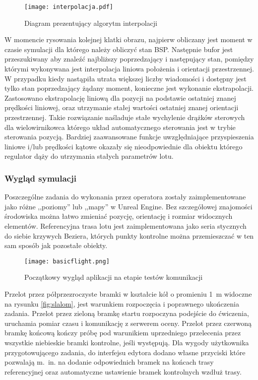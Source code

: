 \begin{figure}[!h]
    \caption{Diagram prezentujący algorytm interpolacji}
    \label{fig:interpolacja}
    \centering \texttt{[image: interpolacja.pdf]}
\end{figure}

W momencie rysowania kolejnej klatki obrazu, najpierw obliczany jest moment w czasie symulacji dla którego należy obliczyć stan BSP. Następnie bufor jest przeszukiwany aby znaleźć najbliższy poprzedzający i następujący stan, pomiędzy którymi wykonywana jest interpolacja liniowa położenia i orientacji przestrzennej. W przypadku kiedy nastąpiła utrata większej liczby wiadomości i dostępny jest tylko stan poprzedzający żądany moment, konieczne jest wykonanie ekstrapolacji. Zastosowano ekstrapolację liniową dla pozycji na podstawie ostatniej znanej prędkości liniowej, oraz utrzymanie stałej wartości ostatniej znanej orientacji przestrzennej. Takie rozwiązanie naśladuje stałe wychylenie drążków sterowych dla wielowirnikowca którego układ automatycznego sterowania jest w trybie sterowania pozycją. Bardziej zaawansowane funkcje uwzględniające przyspieszenia liniowe i/lub prędkości kątowe okazały się nieodpowiednie dla obiektu którego regulator dąży do utrzymania stałych parametrów lotu.

\subsubsection{Wygląd symulacji}
Poszczególne zadania do wykonania przez operatora zostały zaimplementowane jako różne ,,poziomy'' lub ,,mapy'' w Unreal Engine. Bez szczegółowej znajomości środowiska można łatwo zmieniać pozycję, orientację i rozmiar widocznych elementów. Referencyjna trasa lotu jest zaimplementowana jako seria stycznych do siebie krzywych Beziera, których punkty kontrolne można przemieszczać w ten sam sposób jak pozostałe obiekty.

\begin{figure}[!h]
    \caption{Początkowy wygląd aplikacji na etapie testów komunikacji}
    \label{fig:basicflight}
    \centering \texttt{[image: basicflight.png]}
\end{figure}

Przelot przez półprzezroczyste bramki w kształcie kół o promieniu 1~m widoczne na rysunku \ref{fig:slalom}, jest warunkiem rozpoczęcia i poprawnego ukończenia zadania. Przelot przez zieloną bramkę startu rozpoczyna podejście do ćwiczenia, uruchamia pomiar czasu i komunikację z serwerem oceny. Przelot przez czerwoną bramkę końcową kończy próbę pod warunikiem uprzedniego przelecenia przez wszystkie niebieskie bramki kontrolne, jeśli występują. Dla wygody użytkownika przygotowującego zadania, do interfejsu edytora dodano własne przyciski które pozwalają m.~in. na dodanie odpowiednich bramek na końcach trasy referencyjnej oraz automatyczne ustawienie bramek kontrolnych wzdłuż trasy.

